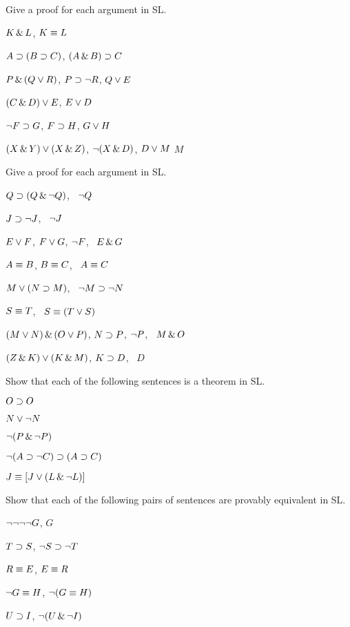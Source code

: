 \solutions
\problempart
\label{pr.solvedSLproofs}
Give a proof for each argument in SL.
\begin{earg}
\item $K\,\&\, L$, \therefore $K\equiv L$
\item $A\supset (B\supset C)$, \therefore $(A\,\&\, B)\supset C$
\item $P \,\&\, (Q\vee R)$, $P\supset \neg R$, \therefore $Q\vee E$
\item $(C\,\&\, D)\vee E$, \therefore $E\vee D$
\item $\neg F\supset G$, $F\supset H$, \therefore $G\vee H$
\item $(X\,\&\, Y)\vee(X\,\&\, Z)$, $\neg(X\,\&\, D)$, $D\vee M$ \therefore $M$
\end{earg}

\problempart
Give a proof for each argument in SL.
\begin{earg}
\item $Q\supset(Q\,\&\,\neg Q)$, \therefore\ $\neg Q$
\item $J\supset\neg J$, \therefore\ $\neg J$
\item $E\vee F$, $F\vee G$, $\neg F$, \therefore\ $E \,\&\, G$
\item $A\equiv B$, $B\equiv C$, \therefore\ $A\equiv C$
\item $M\vee(N\supset M)$, \therefore\ $\neg M \supset \neg N$
\item $S\equiv T$, \therefore\ $S\equiv (T\vee S)$
\item $(M \vee N) \,\&\, (O \vee P)$, $N \supset P$, $\neg P$, \therefore\ $M\,\&\, O$
\item $(Z\,\&\, K) \vee (K\,\&\, M)$, $K \supset D$, \therefore\ $D$
\end{earg}


\solutions
\problempart
\label{pr.SLND.theorems}
Show that each of the following sentences is a theorem in SL.
\begin{earg}
\item $O \supset O$
\item $N \vee \neg N$
\item $\neg(P\,\&\, \neg P)$
\item $\neg(A \supset \neg C) \supset (A \supset C)$
\item $J \equiv [J\vee (L\,\&\,\neg L)]$
\end{earg}

\problempart
Show that each of the following pairs of sentences are provably equivalent in SL.
\begin{earg}
\item $\neg\neg\neg\neg G$, $G$
\item $T\supset S$, $\neg S \supset \neg T$
\item $R \equiv E$, $E \equiv R$
\item $\neg G \equiv H$, $\neg(G \equiv H)$
\item $U \supset I$, $\neg(U \,\&\, \neg I)$
\end{earg}

